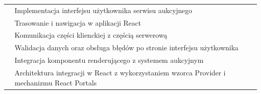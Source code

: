 \begin{table}[H]
\begin{tabularx}{\textwidth}{|l|X|}
                   & Implementacja interfejsu użytkownika serwisu aukcyjnego                                     \\
                   & Trasowanie i nawigacja w aplikacji React                                                    \\
                   & Komunikacja części klienckiej z częścią serwerową                                           \\
                   & Walidacja danych oraz obsługa błędów po stronie interfejsu użytkownika                      \\
                   & Integracja komponentu renderującego z systemem aukcyjnym                                    \\
                   & Architektura integracji w React z wykorzystaniem wzorca Provider i mechanizmu React Portals \\
    \hline
  \end{tabularx}
\end{table}

\newpage